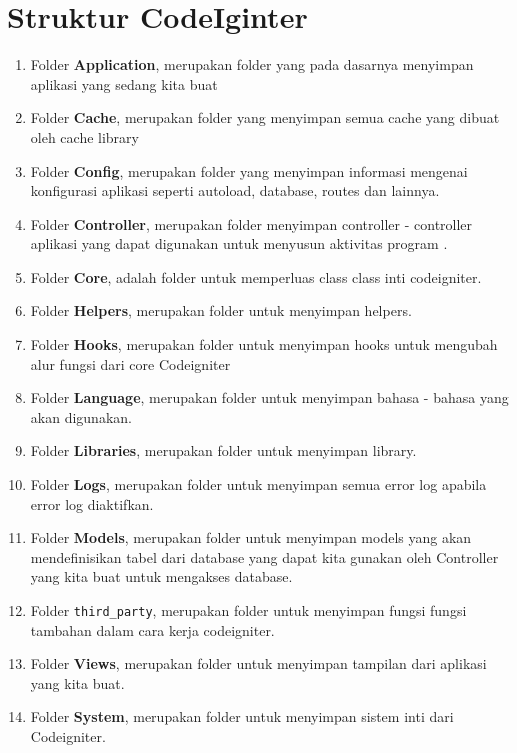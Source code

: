 \section{Struktur CodeIginter}
\begin{enumerate}
    \item Folder \textbf{Application}, merupakan folder yang pada dasarnya menyimpan aplikasi yang sedang kita buat
    \item Folder \textbf{Cache}, merupakan folder yang menyimpan semua cache yang dibuat oleh cache library
    \item Folder \textbf{Config}, merupakan folder yang menyimpan informasi mengenai konfigurasi aplikasi seperti autoload, database, routes dan lainnya.
    \item Folder \textbf{Controller}, merupakan folder menyimpan controller - controller aplikasi yang dapat digunakan untuk menyusun aktivitas program .
    \item Folder \textbf{Core}, adalah folder untuk memperluas class class inti codeigniter.
    \item Folder \textbf{Helpers}, merupakan folder untuk menyimpan helpers.
    \item Folder \textbf{Hooks}, merupakan folder untuk menyimpan hooks untuk mengubah alur fungsi dari core Codeigniter
    \item Folder \textbf{Language}, merupakan folder untuk menyimpan bahasa - bahasa yang akan digunakan.
    \item Folder \textbf{Libraries}, merupakan folder untuk menyimpan library.
    \item Folder \textbf{Logs}, merupakan folder untuk menyimpan semua error log apabila error log diaktifkan.
    \item Folder \textbf{Models}, merupakan folder untuk menyimpan models yang akan mendefinisikan tabel dari database yang dapat kita gunakan oleh Controller yang kita buat untuk mengakses database.
    \item Folder \verb|third_party|, merupakan folder untuk menyimpan fungsi fungsi tambahan dalam cara kerja codeigniter.
    \item Folder \textbf{Views}, merupakan folder untuk menyimpan tampilan dari aplikasi yang kita buat.
    \item Folder \textbf{System}, merupakan folder untuk menyimpan sistem inti dari Codeigniter.
\end{enumerate}

